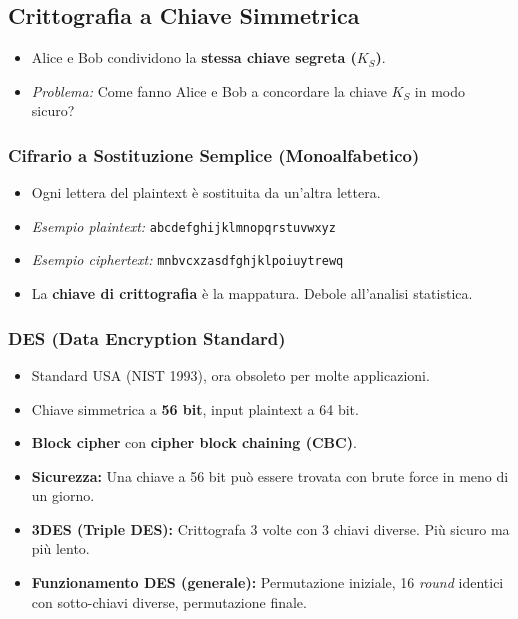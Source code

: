 \subsection{Crittografia a Chiave Simmetrica}
\begin{itemize}
    \item Alice e Bob condividono la \textbf{stessa chiave segreta ($K_S$)}.
    \item \textit{Problema:} Come fanno Alice e Bob a concordare la chiave $K_S$ in modo sicuro?
\end{itemize}

\subsubsection{Cifrario a Sostituzione Semplice (Monoalfabetico)}
\begin{itemize}
    \item Ogni lettera del plaintext è sostituita da un'altra lettera.
    \item \textit{Esempio plaintext:} \texttt{abcdefghijklmnopqrstuvwxyz}
    \item \textit{Esempio ciphertext:} \texttt{mnbvcxzasdfghjklpoiuytrewq}
    \item La \textbf{chiave di crittografia} è la mappatura. Debole all'analisi statistica.
\end{itemize}

\subsubsection{DES (Data Encryption Standard)}
\begin{itemize}
    \item Standard USA (NIST 1993), ora obsoleto per molte applicazioni.
    \item Chiave simmetrica a \textbf{56 bit}, input plaintext a 64 bit.
    \item \textbf{Block cipher} con \textbf{cipher block chaining (CBC)}.
    \item \textbf{Sicurezza:} Una chiave a 56 bit può essere trovata con brute force in meno di un giorno.
    \item \textbf{3DES (Triple DES):} Crittografa 3 volte con 3 chiavi diverse. Più sicuro ma più lento.
    \item \textbf{Funzionamento DES (generale):} Permutazione iniziale, 16 \textit{round} identici con sotto-chiavi diverse, permutazione finale.
\end{itemize}

